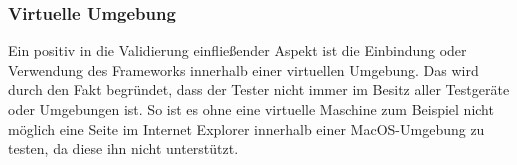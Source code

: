 	\subsubsection{Virtuelle Umgebung}
	Ein positiv in die Validierung einfließender Aspekt ist die Einbindung oder Verwendung des \Gls{Framework}s innerhalb einer virtuellen Umgebung. Das wird durch den Fakt begründet, dass der Tester nicht immer im Besitz aller Testgeräte oder Umgebungen ist. So ist es ohne eine virtuelle Maschine zum Beispiel nicht möglich eine Seite im Internet Explorer innerhalb einer MacOS-Umgebung zu testen, da diese ihn nicht unterstützt.

